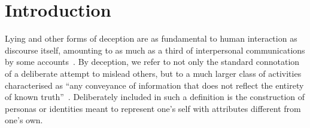 \documentclass{sig-alternate}
\begin{document}





\section{Introduction}



Lying and other forms of deception are as fundamental to human interaction as discourse itself, amounting to as much as a third of interpersonal communications by some accounts~\cite{depaulo1996lying,bok2011lying}.  By deception, we refer to not only the standard connotation of a deliberate attempt to mislead others, but to a much larger class of activities characterised as ``any conveyance of information that does not reflect the entirety of known truth''~\cite{camden1984white}.  Deliberately included in such a definition is the construction of personas or identities meant to represent one's self with attributes different from one's own. 
\end{document}
